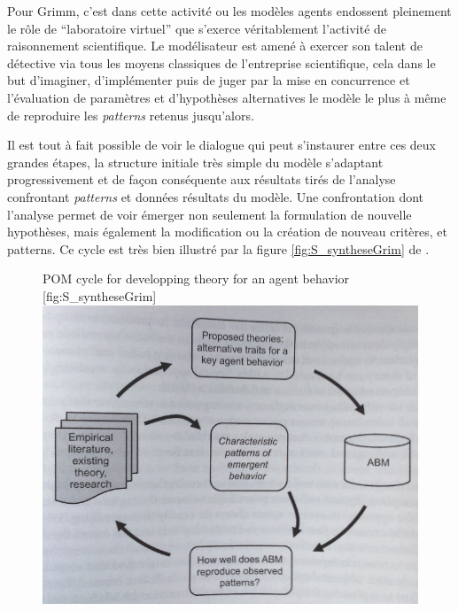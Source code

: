 Pour Grimm, c'est dans cette activité ou les modèles agents endossent pleinement le rôle de \enquote{laboratoire virtuel} que s'exerce véritablement l'activité de raisonnement scientifique. Le modélisateur est amené à exercer son talent de détective via tous les moyens classiques de l'entreprise scientifique, cela dans le but d'imaginer, d'implémenter puis de juger par la mise en concurrence et l'évaluation de paramètres et d'hypothèses alternatives le modèle le plus à même de reproduire les \textit{patterns} retenus jusqu'alors. 

Il est tout à fait possible de voir le dialogue qui peut s'instaurer entre ces deux grandes étapes, la structure initiale très simple du modèle s'adaptant progressivement et de façon conséquente aux résultats tirés de l'analyse confrontant \textit{patterns} et données résultats du modèle. Une confrontation dont l'analyse permet de voir émerger non seulement la formulation de nouvelle hypothèses, mais également la modification ou la création de nouveau critères, et patterns. Ce cycle est très bien illustré par la figure \ref{fig:S_syntheseGrim} de \textcite{Railsback2012}.

\begin{figure}[h]
\begin{sidecaption}{ POM cycle for developping theory for an agent behavior \autocite[245]{Railsback2012}}[fig:S_syntheseGrim]
  \centering
 \includegraphics[width=.9\linewidth]{cyclePOMcomportement.png}
  \end{sidecaption}
\end{figure}


